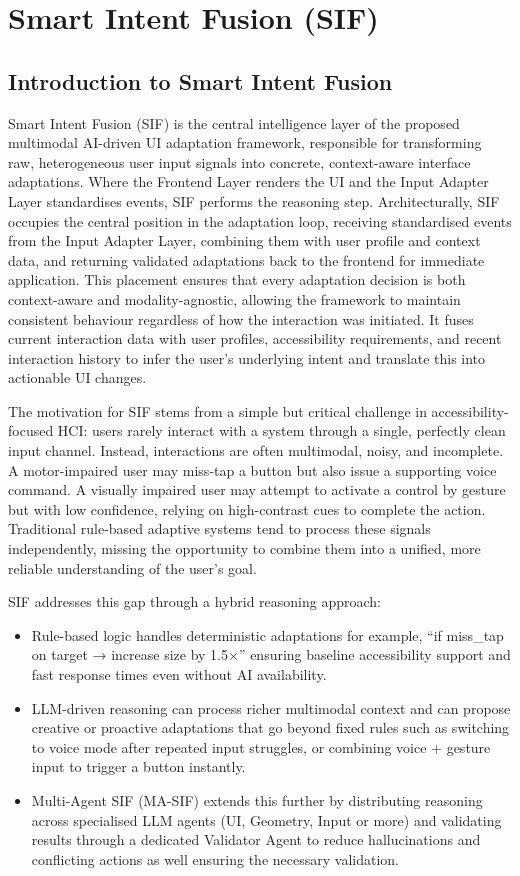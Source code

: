 \chapter{Smart Intent Fusion (SIF)}
\label{ch:chapter4}
\section{Introduction to Smart Intent Fusion}
Smart Intent Fusion (SIF) is the central intelligence layer of the proposed multimodal AI-driven UI adaptation framework, responsible for transforming raw, heterogeneous user input signals into concrete, context-aware interface adaptations. 
Where the Frontend Layer renders the UI and the Input Adapter Layer standardises events, SIF performs the reasoning step. Architecturally, SIF occupies the central position in the adaptation loop, receiving standardised events from the Input Adapter Layer, combining them with user profile and context data, and returning validated adaptations back to the frontend for immediate application. This placement ensures that every adaptation decision is both context-aware and modality-agnostic, allowing the framework to maintain consistent behaviour regardless of how the interaction was initiated.
It fuses current interaction data with user profiles, accessibility requirements, and recent interaction history to infer the user’s underlying intent and translate this into actionable UI changes.

The motivation for SIF stems from a simple but critical challenge in accessibility-focused HCI:
users rarely interact with a system through a single, perfectly clean input channel. Instead, interactions are often multimodal, noisy, and incomplete. A motor-impaired user may miss-tap a button but also issue a supporting voice command. A visually impaired user may attempt to activate a control by gesture but with low confidence, relying on high-contrast cues to complete the action. Traditional rule-based adaptive systems tend to process these signals independently, missing the opportunity to combine them into a unified, more reliable understanding of the user’s goal.

SIF addresses this gap through a hybrid reasoning approach:
\begin{itemize}
    \item Rule-based logic handles deterministic adaptations for example, “if miss\_tap on target → increase size by 1.5×” ensuring baseline accessibility support and fast response times even without AI availability.
    \item LLM-driven reasoning can process richer multimodal context and can propose creative or proactive adaptations that go beyond fixed rules such as switching to voice mode after repeated input struggles, or combining voice + gesture input to trigger a button instantly.
    \item Multi-Agent SIF (MA-SIF) extends this further by distributing reasoning across specialised LLM agents (UI, Geometry, Input or more) and validating results through a dedicated Validator Agent to reduce hallucinations and conflicting actions as well ensuring the necessary validation.
\end{itemize}

